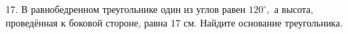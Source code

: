 17. В равнобедренном треугольнике один из углов равен $120^\circ,$ а высота, проведённая к боковой стороне, равна 17 см. Найдите основание треугольника.\\
